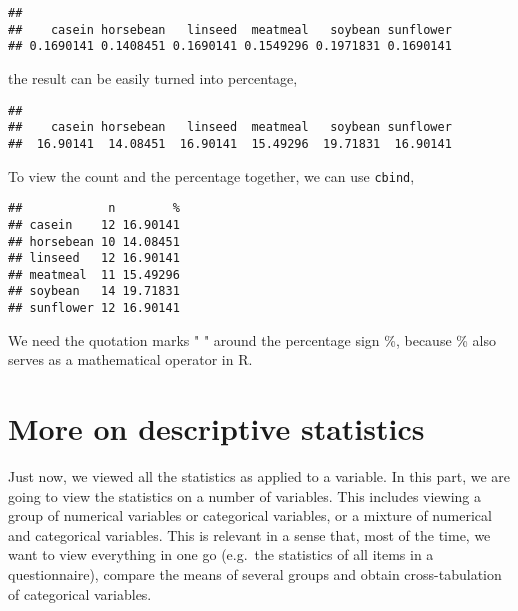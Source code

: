 \documentclass[]{book}
\newenvironment{Shaded}{\begin{snugshade}}{\end{snugshade}}
\newcommand{\KeywordTok}[1]{\textcolor[rgb]{0.13,0.29,0.53}{\textbf{{#1}}}}
\newcommand{\DataTypeTok}[1]{\textcolor[rgb]{0.13,0.29,0.53}{{#1}}}
\newcommand{\DecValTok}[1]{\textcolor[rgb]{0.00,0.00,0.81}{{#1}}}
\newcommand{\StringTok}[1]{\textcolor[rgb]{0.31,0.60,0.02}{{#1}}}
\newcommand{\NormalTok}[1]{{#1}}
\theoremstyle{definition}
\theoremstyle{definition}
\theoremstyle{remark}
\begin{document}
\begin{verbatim}
## 
##    casein horsebean   linseed  meatmeal   soybean sunflower 
## 0.1690141 0.1408451 0.1690141 0.1549296 0.1971831 0.1690141
\end{verbatim}

the result can be easily turned into percentage,

\begin{Shaded}
\end{Shaded}

\begin{verbatim}
## 
##    casein horsebean   linseed  meatmeal   soybean sunflower 
##  16.90141  14.08451  16.90141  15.49296  19.71831  16.90141
\end{verbatim}

To view the count and the percentage together, we can use
\texttt{cbind},

\begin{Shaded}
\end{Shaded}

\begin{verbatim}
##            n        %
## casein    12 16.90141
## horsebean 10 14.08451
## linseed   12 16.90141
## meatmeal  11 15.49296
## soybean   14 19.71831
## sunflower 12 16.90141
\end{verbatim}

We need the quotation marks " " around the percentage sign \%, because
\% also serves as a mathematical operator in R.

\section{More on descriptive
statistics}\label{more-on-descriptive-statistics}

Just now, we viewed all the statistics as applied to a variable. In this
part, we are going to view the statistics on a number of variables. This
includes viewing a group of numerical variables or categorical
variables, or a mixture of numerical and categorical variables. This is
relevant in a sense that, most of the time, we want to view everything
in one go (e.g.~the statistics of all items in a questionnaire), compare
the means of several groups and obtain cross-tabulation of categorical
variables.
\end{document}
